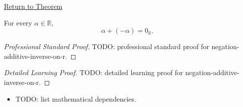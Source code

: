 \newpage
{}
\label{prf:negation-additive-inverse-on-r}

\begin{remark*}[Return]
\hyperref[thm:negation-additive-inverse-on-r]{Return to Theorem}
\end{remark*}

\begin{theorem*}
For every $\alpha\in\mathbb{R}$,
\[
\alpha+(-\alpha)=0_{\mathbb{R}}.
\]
\end{theorem*}

\begin{proof}[Professional Standard Proof]
\LRAProofBodyStart
TODO: professional standard proof for negation-additive-inverse-on-r.
\end{proof}

\begin{proof}[Detailed Learning Proof]
\LRAProofBodyStart
TODO: detailed learning proof for negation-additive-inverse-on-r.
\end{proof}

\begin{remark*}
\end{remark*}

\begin{dependencies}
\begin{itemize}
  \item TODO: list mathematical dependencies.
\end{itemize}
\end{dependencies}

\clearpage
